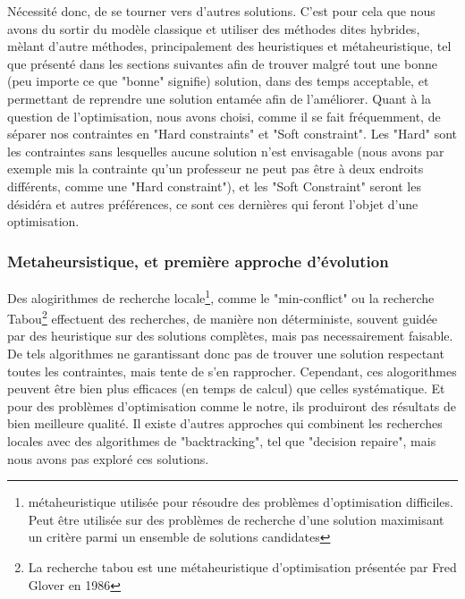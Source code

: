 Nécessité donc, de se tourner vers d'autres solutions.
\newline
\indent
C'est pour cela que nous avons du sortir du modèle classique et utiliser des méthodes dites hybrides, mèlant d'autre méthodes, principalement des heuristiques et métaheuristique, tel que présenté dans les sections suivantes afin de trouver malgré tout une bonne (peu importe ce que "bonne" signifie) solution, dans des temps acceptable, et permettant de reprendre une solution entamée afin de l'améliorer. \newline
Quant à la question de l'optimisation, nous avons choisi, comme il se fait fréquemment, de séparer nos contraintes en "Hard constraints" et "Soft constraint".  Les "Hard" sont les contraintes sans lesquelles aucune solution n'est envisagable (nous avons par exemple mis la contrainte qu'un professeur ne peut pas être à deux endroits différents, comme une "Hard constraint"), et les "Soft Constraint" seront les désidéra et autres préférences, ce sont ces dernières qui feront l'objet d'une optimisation. 
\subsubsection{Metaheursistique, et première approche d'évolution}
Des alogirithmes de recherche locale\footnote{métaheuristique utilisée pour résoudre des problèmes d'optimisation difficiles. Peut être utilisée sur des problèmes de recherche d'une solution maximisant un critère parmi un ensemble de solutions candidates}, comme le "min-conflict" ou la recherche Tabou\footnote{La recherche tabou est une métaheuristique d'optimisation présentée par Fred Glover en 1986} effectuent des recherches, de manière non déterministe, souvent guidée par des heuristique sur des solutions complètes, mais pas necessairement faisable.  
De tels algorithmes ne garantissant donc pas de trouver une solution respectant toutes les contraintes, mais tente de s'en rapprocher. Cependant, ces alogorithmes peuvent être bien plus efficaces (en temps de calcul) que celles systématique. Et pour des problèmes d'optimisation comme le notre, ils produiront des résultats de bien meilleure qualité.
Il existe d'autres approches qui combinent les recherches locales avec des algorithmes de "backtracking", tel que "decision repaire", mais nous avons pas exploré ces solutions.

